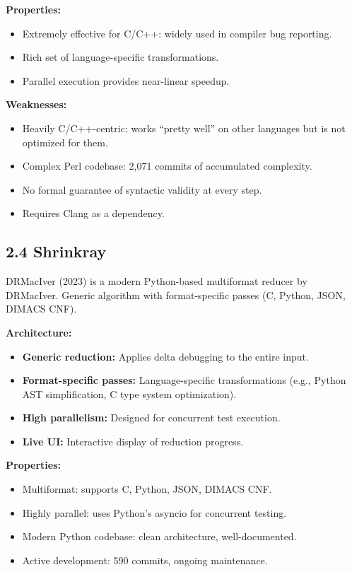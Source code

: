 \documentclass[
  letterpaper,
]{article}
\providecommand{\tightlist}{%
  \setlength{\itemsep}{0pt}\setlength{\parskip}{0pt}}
\begin{document}
\textbf{Properties:}

\begin{itemize}
\tightlist
\item
  Extremely effective for C/C++: widely used in compiler bug reporting.
\item
  Rich set of language-specific transformations.
\item
  Parallel execution provides near-linear speedup.
\end{itemize}

\textbf{Weaknesses:}

\begin{itemize}
\tightlist
\item
  Heavily C/C++-centric: works ``pretty well'' on other languages but is
  not optimized for them.
\item
  Complex Perl codebase: 2,071 commits of accumulated complexity.
\item
  No formal guarantee of syntactic validity at every step.
\item
  Requires Clang as a dependency.
\end{itemize}

\subsection{2.4 Shrinkray}\label{shrinkray}

DRMacIver (2023) is a modern Python-based multiformat reducer by
DRMacIver. Generic algorithm with format-specific passes (C, Python,
JSON, DIMACS CNF).

\textbf{Architecture:}

\begin{itemize}
\tightlist
\item
  \textbf{Generic reduction:} Applies delta debugging to the entire
  input.
\item
  \textbf{Format-specific passes:} Language-specific transformations
  (e.g., Python AST simplification, C type system optimization).
\item
  \textbf{High parallelism:} Designed for concurrent test execution.
\item
  \textbf{Live UI:} Interactive display of reduction progress.
\end{itemize}

\textbf{Properties:}

\begin{itemize}
\tightlist
\item
  Multiformat: supports C, Python, JSON, DIMACS CNF.
\item
  Highly parallel: uses Python's asyncio for concurrent testing.
\item
  Modern Python codebase: clean architecture, well-documented.
\item
  Active development: 590 commits, ongoing maintenance.
\end{itemize}
\end{document}
